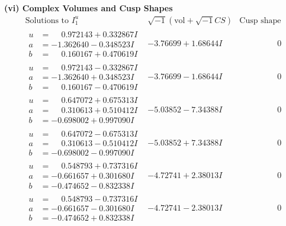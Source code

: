 \documentclass[1p]{elsarticle_modified}
\theoremstyle{definition}
\newcommand{\I}{\sqrt{-1}}
\begin{document}
\newpage\flushleft \textbf{(vi) Complex Volumes and Cusp Shapes}
$$\begin{array}{c|c|c}  
\text{Solutions to }I^u_{1}& \I (\text{vol} + \sqrt{-1}CS) & \text{Cusp shape}\\
 \hline 
\begin{aligned}
u &= \phantom{-}0.972143 + 0.332867 I \\
a &= -1.362640 - 0.348523 I \\
b &= \phantom{-}0.160167 + 0.470619 I\end{aligned}
 & -3.76699 + 1.68644 I & \phantom{-0.000000 } 0 \\ \hline\begin{aligned}
u &= \phantom{-}0.972143 - 0.332867 I \\
a &= -1.362640 + 0.348523 I \\
b &= \phantom{-}0.160167 - 0.470619 I\end{aligned}
 & -3.76699 - 1.68644 I & \phantom{-0.000000 } 0 \\ \hline\begin{aligned}
u &= \phantom{-}0.647072 + 0.675313 I \\
a &= \phantom{-}0.310613 + 0.510412 I \\
b &= -0.698002 + 0.997090 I\end{aligned}
 & -5.03852 - 7.34388 I & \phantom{-0.000000 } 0 \\ \hline\begin{aligned}
u &= \phantom{-}0.647072 - 0.675313 I \\
a &= \phantom{-}0.310613 - 0.510412 I \\
b &= -0.698002 - 0.997090 I\end{aligned}
 & -5.03852 + 7.34388 I & \phantom{-0.000000 } 0 \\ \hline\begin{aligned}
u &= \phantom{-}0.548793 + 0.737316 I \\
a &= -0.661657 + 0.301680 I \\
b &= -0.474652 - 0.832338 I\end{aligned}
 & -4.72741 + 2.38013 I & \phantom{-0.000000 } 0 \\ \hline\begin{aligned}
u &= \phantom{-}0.548793 - 0.737316 I \\
a &= -0.661657 - 0.301680 I \\
b &= -0.474652 + 0.832338 I\end{aligned}
 & -4.72741 - 2.38013 I & \phantom{-0.000000 } 0 \\ \hline\begin{aligned}

\end{aligned}
\end{array}$$
\end{document}
